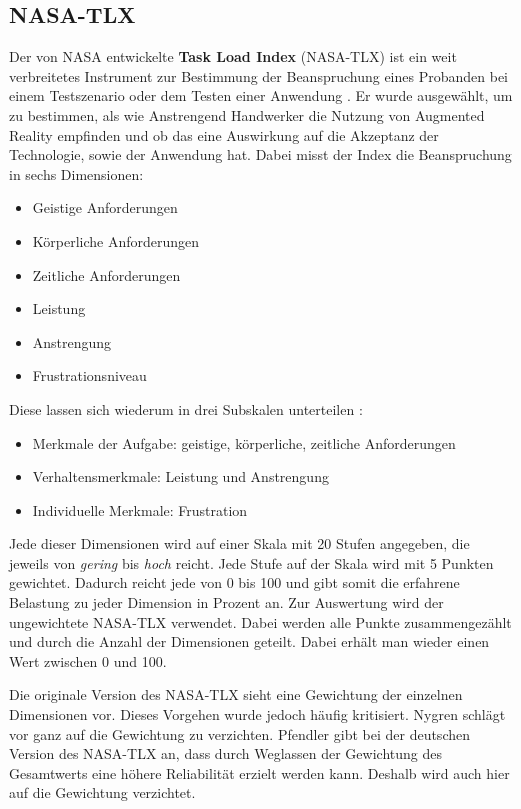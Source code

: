 \subsection{NASA-TLX}

Der von NASA entwickelte \textbf{Task Load Index} (NASA-TLX) ist ein weit verbreitetes Instrument zur Bestimmung der Beanspruchung eines Probanden bei einem Testszenario oder dem Testen einer Anwendung \cite{giesa_bewertung_2003}. Er wurde ausgewählt, um zu bestimmen, als wie Anstrengend Handwerker die Nutzung von Augmented Reality empfinden und ob das eine Auswirkung auf die Akzeptanz der Technologie, sowie der Anwendung hat. Dabei misst der Index die Beanspruchung in sechs Dimensionen:

\begin{itemize}
	\item Geistige Anforderungen
	\item Körperliche Anforderungen
	\item Zeitliche Anforderungen
	\item Leistung
	\item Anstrengung
	\item Frustrationsniveau
\end{itemize}

Diese lassen sich wiederum in drei Subskalen unterteilen \cite{gros_bestimmung_2004}:

\begin{itemize}
	\item Merkmale der Aufgabe: geistige, körperliche, zeitliche Anforderungen
	\item Verhaltensmerkmale: Leistung und Anstrengung
	\item Individuelle Merkmale: Frustration
\end{itemize}

Jede dieser Dimensionen wird auf einer Skala mit 20 Stufen angegeben, die jeweils von \textit{gering} bis \textit{hoch} reicht. Jede Stufe auf der Skala wird mit 5 Punkten gewichtet. Dadurch reicht jede von 0 bis 100 und gibt somit die erfahrene Belastung zu jeder Dimension in Prozent an. Zur Auswertung wird der ungewichtete NASA-TLX verwendet. Dabei werden alle Punkte zusammengezählt und durch die Anzahl der Dimensionen geteilt. Dabei erhält man wieder einen Wert zwischen 0 und 100.

Die originale Version des NASA-TLX sieht eine Gewichtung der einzelnen Dimensionen vor. Dieses Vorgehen wurde jedoch häufig kritisiert. Nygren \cite{nygren_psychometric_1991} schlägt vor ganz auf die Gewichtung zu verzichten. Pfendler \cite{pfendler_vergleichende_1991} gibt bei der deutschen Version des NASA-TLX an, dass durch Weglassen der Gewichtung des Gesamtwerts eine höhere Reliabilität erzielt werden kann. Deshalb wird auch hier auf die Gewichtung verzichtet.

